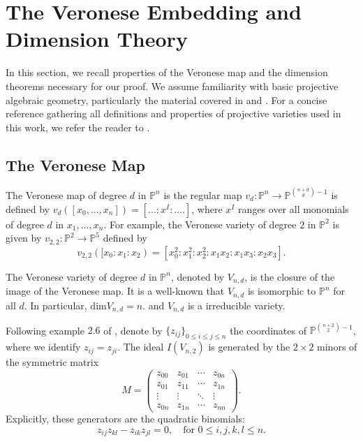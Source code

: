 \documentclass{amsart}
\newtheorem{corollary}[theorem]{Corollary}
\theoremstyle{definition}
\theoremstyle{remark}
\numberwithin{equation}{section}
\begin{document}


\section{The Veronese Embedding and Dimension Theory}\label{sec:ver}


In this section, we recall properties of the Veronese map and the dimension theorems necessary for our proof. We assume familiarity with basic projective algebraic geometry, particularly the material covered in \cite[Lecture 1]{harris1992algebraic} and \cite[Chapter 1]{shafarevich1994basic}. For a concise reference gathering all definitions and properties of projective varieties used in this work, we refer the reader to \cite[Section 4]{moeckel2001generic}.


\subsection{The Veronese Map}
The Veronese map  of degree $d$ in $\mathbb{P}^n$ is the regular map $v_{d}: \mathbb{P}^n \rightarrow \mathbb{P}^{\binom{n+d}{d}-1}$ is defined by  $v_{d}([x_0,...,x_n])=[...:x^{I}:....]$, where $x^{I}$ ranges over all monomials of degree $d$ in $x_1,...,x_n$. For example, the Veronese variety of degree $2$ in $\mathbb{P}^2$ is given by $v_{2,2}: \mathbb{P}^2 \rightarrow \mathbb{P}^5$ defined by
$$v_{2,2}([x_0:x_1:x_2)=[x_{0}^2:x_{1}^2:x_{2}^2:x_1x_2:x_1x_3:x_2x_3].$$

The Veronese variety of degree $d$ in $\mathbb{P}^n$, denoted by $V_{n,d}$, is the closure of the image of the Veronese map.
It is a well-known that $V_{n,d}$ is isomorphic to $\mathbb{P}^{n}$ for all $d$. In particular, $\text{dim}V_{n,d}=n.$ and $V_{n,d}$ is a irreducible variety.


Following example $2.6$ of \cite{harris1992algebraic}, denote by $\{z_{ij}\}_{0 \leq i \leq j \leq n}$ the coordinates of $\mathbb{P}^{\binom{n+2}{2}-1}$, where we identify $z_{ij} = z_{ji}$.  The ideal $I(V_{n,2})$ is generated by the $2 \times 2$ minors of the symmetric matrix
\[
M =
\begin{pmatrix}
z_{00} & z_{01} & \cdots & z_{0n} \\
z_{01} & z_{11} & \cdots & z_{1n} \\
\vdots & \vdots & \ddots & \vdots \\
z_{0n} & z_{1n} & \cdots & z_{nn}
\end{pmatrix}.
\]
Explicitly, these generators are the quadratic binomials:
\[
z_{ij}z_{kl} - z_{ik}z_{jl} = 0, \quad \text{for } 0 \le i,j,k,l \le n.
\]
\end{document}
